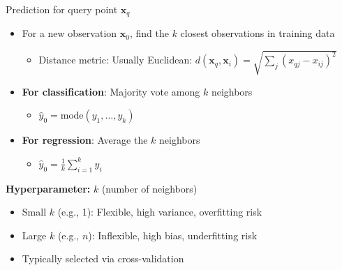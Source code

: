 \documentclass[11pt]{beamer}
\begin{document}
\begin{frame}{Prediction for query point $\mathbf{x}_q$}
	\begin{itemize}
		\setlength{\itemsep}{0.2cm}
		\item For a new observation $\mathbf{x}_0$, find the $k$ closest observations in training data
		      \begin{itemize}
			      \small
			      \item Distance metric: Usually Euclidean: $d(\mathbf{x}_q, \mathbf{x}_i) = \sqrt{\sum_j (x_{qj } - x_{ij})^2}$
		      \end{itemize}
		\item \textbf{For classification}: Majority vote among $k$ neighbors
		      \begin{itemize}
			      \small
			      \item $\hat{y}_0 = \text{mode}(y_1, \ldots, y_k)$
		      \end{itemize}
		\item \textbf{For regression}: Average the $k$ neighbors
		      \begin{itemize}
			      \small
			      \item $\hat{y}_0 = \frac{1}{k} \sum_{i=1}^k y_i$
		      \end{itemize}
	\end{itemize}

	\vspace{0.2cm}

	\textbf{Hyperparameter:} $k$ (number of neighbors)
	\begin{itemize}
		\small
		\item Small $k$ (e.g., 1): Flexible, high variance, overfitting risk
		\item Large $k$ (e.g., $n$): Inflexible, high bias, underfitting risk
		\item Typically selected via cross-validation
	\end{itemize}
\end{frame}
\end{document}
